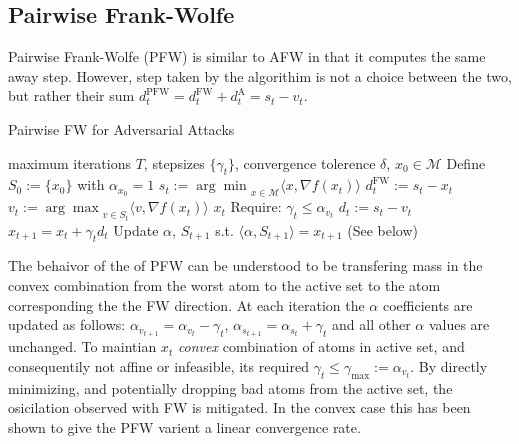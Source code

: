 \documentclass{article}
\begin{document}
\subsection{Pairwise Frank-Wolfe}
Pairwise Frank-Wolfe (PFW) is similar to AFW in that it computes the same away step. However, step taken by the algorithim is not a choice between the two, but rather their sum $d_t^\text{PFW} = d_t^\text{FW} + d_t^\text{A} = s_t - v_t$. 

\begin{algorithm}[H]
\caption{Pairwise FW for Adversarial Attacks}\label{alg:cap}
\begin{algorithmic}[1]
\Require maximum iterations $T$, stepsizes $\{\gamma_t\}$, convergence tolerence $\delta$, $x_0 \in \mathcal{M}$
\State Define $S_0 := \{x_0\}$ with $\alpha_{x_0} = 1$
	\State $s_t  := {\arg \min}_{x\in\mathcal{M}} \langle x, \nabla f(x_t)\rangle$ 
	\State $d_t^{\text{FW}} := s_t - x_t$
	\State $v_t  := {\arg \max}_{v\in S_t} \langle v, \nabla f(x_t)\rangle$
	  $x_t$ \hfill {}
	\EndIf
	\State Require: $\gamma_t \leq \alpha_{v_t}$
	\State $d_t := s_t - v_t$
	\State $x_{t+1} = x_t + \gamma_t d_t$
	\State Update $\alpha$, $S_{t+1}$ s.t. $\langle \alpha, S_{t+1}\rangle = x_{t+1}$ (See below)
\EndFor
\end{algorithmic}
\end{algorithm}

The behaivor of the of PFW can be understood to be transfering mass in the convex combination from the worst atom to the active set to the atom corresponding the the FW direction. At each iteration the $\alpha$ coefficients are updated as follows: $\alpha_{v_{t+1}} = \alpha_{v_t} - \gamma_t$, $\alpha_{s_{t+1}} = \alpha_{s_t} + \gamma_t$ and all other $\alpha$ values are unchanged. To maintian $x_t$ \emph{convex} combination of atoms in active set, and consequentily not affine or infeasible, its required $\gamma_t \leq \gamma_\text{max} := \alpha_{v_t}$. By directly minimizing, and potentially dropping bad atoms from the active set, the osicilation observed with FW is mitigated. In the convex case this has been shown to give the PFW varient a linear convergence rate.
\end{document}
